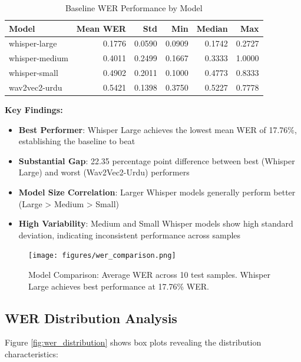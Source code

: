 \begin{table}[H]
\centering
\caption{Baseline WER Performance by Model}
\label{tab:baseline_wer}
\begin{tabular}{lrrrrr}
\toprule
\textbf{Model} & \textbf{Mean WER} & \textbf{Std} & \textbf{Min} & \textbf{Median} & \textbf{Max} \\
\midrule
whisper-large  & 0.1776 & 0.0590 & 0.0909 & 0.1742 & 0.2727 \\
whisper-medium & 0.4011 & 0.2499 & 0.1667 & 0.3333 & 1.0000 \\
whisper-small  & 0.4902 & 0.2011 & 0.1000 & 0.4773 & 0.8333 \\
wav2vec2-urdu  & 0.5421 & 0.1398 & 0.3750 & 0.5227 & 0.7778 \\
\bottomrule
\end{tabular}
\end{table}

\textbf{Key Findings:}

\begin{itemize}
    \item \textbf{Best Performer}: Whisper Large achieves the lowest mean WER of 17.76\%, establishing the baseline to beat
    \item \textbf{Substantial Gap}: 22.35 percentage point difference between best (Whisper Large) and worst (Wav2Vec2-Urdu) performers
    \item \textbf{Model Size Correlation}: Larger Whisper models generally perform better (Large > Medium > Small)
    \item \textbf{High Variability}: Medium and Small Whisper models show high standard deviation, indicating inconsistent performance across samples
\end{itemize}

\begin{figure}[H]
    \centering
    \texttt{[image: figures/wer\_comparison.png]}
    \caption{Model Comparison: Average WER across 10 test samples. Whisper Large achieves best performance at 17.76\% WER.}
    \label{fig:wer_comparison}
\end{figure}

\subsection{WER Distribution Analysis}

Figure \ref{fig:wer_distribution} shows box plots revealing the distribution characteristics:

